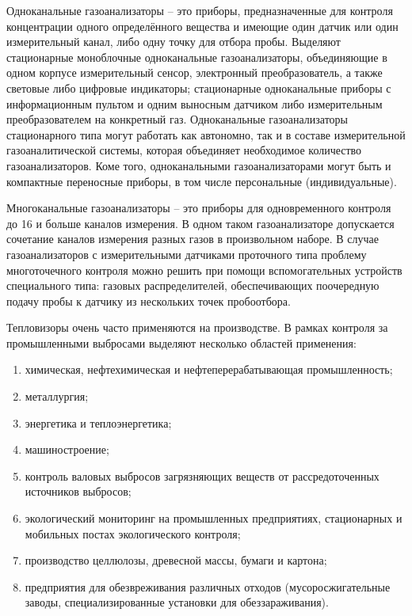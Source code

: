 \documentclass[14pt, a4paper]{extreport}
\begin{document}
	Одноканальные газоанализаторы -- это приборы, предназначенные для контроля концентрации одного определённого вещества и имеющие один датчик или один измерительный канал, либо одну точку для отбора пробы. Выделяют стационарные моноблочные одноканальные газоанализаторы, объединяющие в одном корпусе измерительный сенсор, электронный преобразователь, а также световые либо цифровые индикаторы; стационарные одноканальные приборы с информационным пультом и одним выносным датчиком либо измерительным преобразователем на конкретный газ. Одноканальные газоанализаторы стационарного типа могут работать как автономно, так и в составе измерительной газоаналитической системы, которая объединяет необходимое количество газоанализаторов. Коме того, одноканальными газоанализаторами могут быть и компактные переносные приборы, в том числе персональные (индивидуальные).
	
	Многоканальные газоанализаторы -- это приборы для одновременного контроля до 16 и больше каналов измерения. В одном таком газоанализаторе допускается сочетание каналов измерения разных газов в произвольном наборе. В случае газоанализаторов с измерительными датчиками проточного типа проблему многоточечного контроля можно решить при помощи вспомогательных устройств специального типа: газовых распределителей, обеспечивающих поочередную подачу пробы к датчику из нескольких точек пробоотбора. 
	
	Тепловизоры очень часто применяются на производстве. В рамках контроля за промышленными выбросами выделяют несколько областей применения:
	\begin{enumerate}[label={\arabic*)}]
		\item химическая, нефтехимическая и нефтеперерабатывающая промышленность;
		\item металлургия;
		\item энергетика и теплоэнергетика;
		\item машиностроение;
		\item контроль валовых выбросов загрязняющих веществ от рассредоточенных источников выбросов;
		\item экологический мониторинг на промышленных предприятиях, стационарных и мобильных постах экологического контроля;
		\item производство целлюлозы, древесной массы, бумаги и картона;
		\item предприятия для обезвреживания различных отходов (мусоросжигательные заводы, специализированные установки для обеззараживания).
	\end{enumerate}
\end{document}
